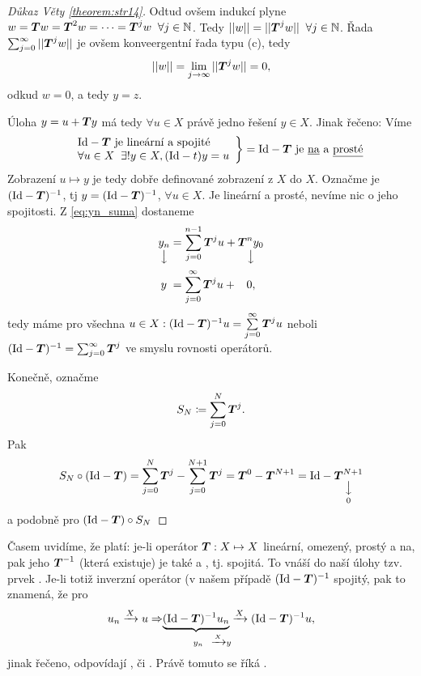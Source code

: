\begin{proof}[Důkaz Věty \ref{theorem:str14}]
Odtud ovšem indukcí plyne $w= \boldsymbol{T} w= \boldsymbol{T} ^2w=\dots = \boldsymbol{T} ^jw \;\; \forall j\in \mathbb{N}$.  Tedy $||w||=|| \boldsymbol{T} ^jw||\;\; \forall j\in \mathbb{N}$. Řada $\sum_{j=0}^\infty|| \boldsymbol{T} ^j w||$ je ovšem konveergentní řada typu (c), tedy 
$$||w||=\lim\limits_{j\rightarrow\infty}|| \boldsymbol{T} ^jw||=0,$$
odkud $w=0$, a tedy $y=z$.

Úloha $y=u+ \boldsymbol{T} y$ má tedy $\forall u\in X$ právě jedno řešení $y\in X$. Jinak řečeno: Víme \begin{equation*}
    \begin{split}
        \left.
    \begin{array}{ll}
        &\mathrm{Id}- \boldsymbol{T}  \text{ je lineární a spojité} \\
        &\forall u\in X\;\;\exists ! y\in X, (\mathrm{Id}-t)y=u
    \end{array}
        \right \}=\mathrm{Id}- \boldsymbol{T}  \text{ je \underline{na} a \underline{prosté}}
    \end{split}
\end{equation*}
Zobrazení $u\mapsto y$ je tedy dobře definované zobrazení z $X$ do $X$. Označme je $(\mathrm{Id} - \boldsymbol{T} )^{-1}$, tj $y=(\mathrm{Id}- \boldsymbol{T} )^{-1}$, $\forall u\in X$. Je lineární a prosté, nevíme nic o jeho spojitosti.
Z \ref{eq:yn_suma} dostaneme 
\begin{equation*}
    \begin{split}
        \underset{\big\downarrow}{y_n} &= \sum\limits_{j=0}^{n-1} \boldsymbol{T} ^ju+\underset{\big\downarrow}{ \boldsymbol{T} ^ny_0}\\
        y\;&=\sum\limits_{j=0}^\infty  \boldsymbol{T} ^ju+\;\;\;0,
    \end{split}
\end{equation*}
tedy máme pro všechna $u\in X: (\mathrm{Id}- \boldsymbol{T} )^{-1}u=\sum\limits_{j=0}^\infty  \boldsymbol{T} ^ju$ neboli $(\mathrm{Id}- \boldsymbol{T} )^{-1}=\sum_{j=0}^\infty  \boldsymbol{T} ^j$ ve smyslu rovnosti operátorů.

Konečně, označme
$$S_N\coloneqq \sum\limits_{j=0}^N  \boldsymbol{T} ^j.$$
Pak 
$$S_N\circ(\mathrm{Id}- \boldsymbol{T} )=\sum\limits_{j=0}^N  \boldsymbol{T} ^j-\sum\limits_{j=0}^{N+1}  \boldsymbol{T} ^j =  \boldsymbol{T} ^0- \boldsymbol{T} ^{N+1}=\mathrm{Id}-\underset{0}{\underset{\big\downarrow}{ \boldsymbol{T} ^{N+1}}}$$
a podobně pro $(\mathrm{Id}- \boldsymbol{T} )\circ S_N$
\end{proof}

\begin{remark}
Časem uvidíme, že platí: je-li operátor $ \boldsymbol{T} :X\mapsto X$ lineární, omezený, prostý a na, pak jeho  $ \boldsymbol{T} ^{-1}$ (která existuje) je také  a , tj. spojitá. To vnáší do naší úlohy tzv. prvek . Je-li totiž inverzní operátor (v našem případě $(\mathrm{Id}- \boldsymbol{T} )^{-1}$ spojitý, pak to znamená, že pro 
$$u_n\xrightarrow{X}u\Rightarrow \underset{\quad\; y_n\;\;\;\xrightarrow{X}y}{\underbrace{(\mathrm{Id}- \boldsymbol{T} )^{-1}u_n}\xrightarrow{X}}(\mathrm{Id}- \boldsymbol{T} )^{-1}u,$$
jinak řečeno,  odpovídají , či . Právě tomuto se říká .
\end{remark}

